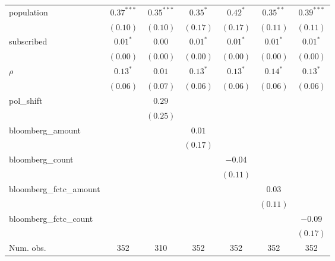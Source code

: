 \begin{table}[!h]
\begin{center}
\begin{tabular}{l c c c c c c }
population              & $0.37^{***}$ & $0.35^{***}$  & $0.35^{*}$   & $0.42^{*}$   & $0.35^{**}$  & $0.39^{***}$ \\
                        & $(0.10)$     & $(0.10)$      & $(0.17)$     & $(0.17)$     & $(0.11)$     & $(0.11)$     \\
subscribed              & $0.01^{*}$   & $0.00$        & $0.01^{*}$   & $0.01^{*}$   & $0.01^{*}$   & $0.01^{*}$   \\
                        & $(0.00)$     & $(0.00)$      & $(0.00)$     & $(0.00)$     & $(0.00)$     & $(0.00)$     \\
$\rho$                  & $0.13^{*}$   & $0.01$        & $0.13^{*}$   & $0.13^{*}$   & $0.14^{*}$   & $0.13^{*}$   \\
                        & $(0.06)$     & $(0.07)$      & $(0.06)$     & $(0.06)$     & $(0.06)$     & $(0.06)$     \\
pol\_shift              &              & $0.29$        &              &              &              &              \\
                        &              & $(0.25)$      &              &              &              &              \\
bloomberg\_amount       &              &               & $0.01$       &              &              &              \\
                        &              &               & $(0.17)$     &              &              &              \\
bloomberg\_count        &              &               &              & $-0.04$      &              &              \\
                        &              &               &              & $(0.11)$     &              &              \\
bloomberg\_fctc\_amount &              &               &              &              & $0.03$       &              \\
                        &              &               &              &              & $(0.11)$     &              \\
bloomberg\_fctc\_count  &              &               &              &              &              & $-0.09$      \\
                        &              &               &              &              &              & $(0.17)$     \\
\midrule
Num. obs.               & 352          & 310           & 352          & 352          & 352          & 352          \\

\end{tabular}
\end{center}
\end{table}
